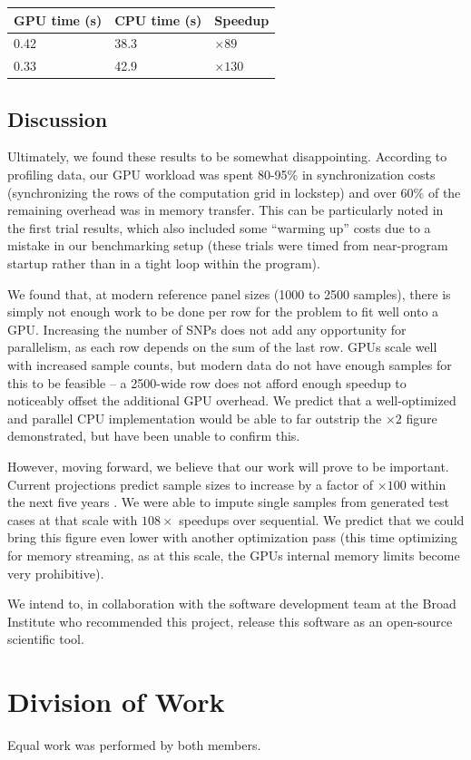 \documentclass[12pt]{article}
\begin{document}
\begin{table}[!ht]
  \begin{tabular}{ll|l}
    GPU time (s) & CPU time (s) & Speedup \\
    \hline
    0.42 & 38.3 & $\times 89$ \\
    0.33 & 42.9 & $\times 130$ \\
  \end{tabular}
\end{table}

\subsection{Discussion}

Ultimately, we found these results to be somewhat disappointing. According to
profiling data, our GPU workload was spent 80-95\% in synchronization costs
(synchronizing the rows of the computation grid in lockstep) and over 60\% of
the remaining overhead was in memory transfer. This can be particularly noted
in the first trial results, which also included some ``warming up'' costs due
to a mistake in our benchmarking setup (these trials were timed from
near-program startup rather than in a tight loop within the program).

We found that, at modern reference panel sizes (1000 to 2500 samples), there is
simply not enough work to be done per row for the problem to fit well onto a
GPU. Increasing the number of SNPs does not add any opportunity for
parallelism, as each row depends on the sum of the last row. GPUs scale well with increased sample counts, but modern data do not have enough samples for this
to be feasible -- a 2500-wide row does not afford enough speedup to noticeably
offset the additional GPU overhead. We predict that a well-optimized and parallel CPU
implementation would be able to far outstrip the $\times 2$ figure
demonstrated, but have been unable to confirm this.

However, moving forward, we believe that our work will prove to be important.
Current projections predict sample sizes to increase by a factor of $\times
100$ within the next five years \cite{genomescale}. We were able to impute single samples from
generated test cases at that scale with $108\times$ speedups over sequential.
We predict that we could bring this figure even lower with
another optimization pass (this time optimizing for memory streaming, as at
this scale, the GPUs internal memory limits become very prohibitive).

We intend to, in collaboration with the software development team at the Broad Institute who recommended this project, release this software as an open-source scientific tool.

\section{Division of Work}

Equal work was performed by both members.



\end{document}
